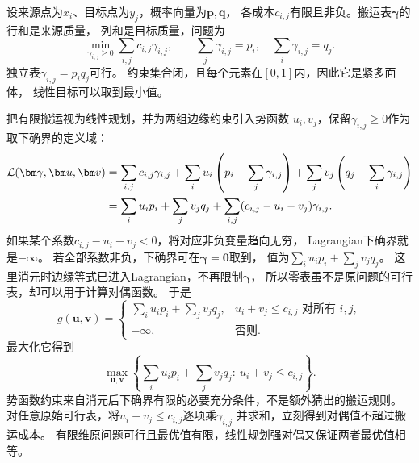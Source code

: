 设来源点为\(x_i\)、目标点为\(y_j\)，概率向量为\(\bm p,\bm q\)，
各成本\(c_{i,j}\)有限且非负。搬运表\(\bm\gamma\)的行和是来源质量，
列和是目标质量，问题为
\[
  \min_{\gamma_{i,j}\geq0}\sum_{i,j}c_{i,j}\gamma_{i,j},
  \qquad \sum_j\gamma_{i,j}=p_i,\quad\sum_i\gamma_{i,j}=q_j.
\]
独立表\(\gamma_{i,j}=p_iq_j\)可行。
约束集合闭，且每个元素在\([0,1]\)内，因此它是紧多面体，
线性目标可以取到最小值。

把有限搬运视为线性规划，并为两组边缘约束引入势函数
\(u_i,v_j\)，保留\(\gamma_{i,j}\geq0\)作为取下确界的定义域：
\begin{align}
  \mathcal L(\bm\gamma,\bm u,\bm v)
  &=\sum_{i,j}c_{i,j}\gamma_{i,j}
    +\sum_i u_i\left(p_i-\sum_j\gamma_{i,j}\right)
    +\sum_j v_j\left(q_j-\sum_i\gamma_{i,j}\right)\notag\\
  &=\sum_i u_ip_i+\sum_jv_jq_j
    +\sum_{i,j}(c_{i,j}-u_i-v_j)\gamma_{i,j}.
  \label{eq:information-discrete-ot-lagrangian}
\end{align}
如果某个系数\(c_{i,j}-u_i-v_j<0\)，将对应非负变量趋向无穷，
Lagrangian下确界就是\(-\infty\)。
若全部系数非负，下确界可在\(\bm\gamma=\bm0\)取到，
值为\(\sum_i u_ip_i+\sum_jv_jq_j\)。
这里消元时边缘等式已进入Lagrangian，不再限制\(\bm\gamma\)，
所以零表虽不是原问题的可行表，却可以用于计算对偶函数。
于是
\[
  g(\bm u,\bm v)=
  \begin{cases}
    \sum_i u_ip_i+\sum_jv_jq_j,&u_i+v_j\leq c_{i,j}\text{ 对所有 }i,j,\\
    -\infty,&\text{否则}.
  \end{cases}
\]
最大化它得到
\begin{equation}
  \max_{\bm u,\bm v}
  \left\{\sum_i u_ip_i+\sum_jv_jq_j:\ u_i+v_j\leq c_{i,j}\right\}.
  \label{eq:information-discrete-ot-dual}
\end{equation}
势函数约束来自消元后下确界有限的必要充分条件，不是额外猜出的搬运规则。
对任意原始可行表，将\(u_i+v_j\leq c_{i,j}\)逐项乘\(\gamma_{i,j}\)
并求和，立刻得到对偶值不超过搬运成本。
有限维原问题可行且最优值有限，线性规划强对偶又保证两者最优值相等。

